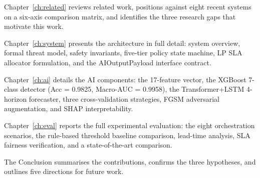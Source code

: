 Chapter~\ref{ch:related} reviews related work, positions \padonap{} against
eight recent systems on a six-axis comparison matrix, and identifies the
three research gaps that motivate this work.

Chapter~\ref{ch:system} presents the \padonap{} architecture in full detail:
system overview, formal threat model, safety invariants, five-tier policy
state machine, LP SLA allocator formulation, and the AIOutputPayload
interface contract.

Chapter~\ref{ch:ai} details the AI components: the 17-feature vector, the
XGBoost 7-class detector (Acc = 0.9825, Macro-AUC = 0.9958), the
Transformer+LSTM 4-horizon forecaster, three cross-validation strategies,
FGSM adversarial augmentation, and SHAP interpretability.

Chapter~\ref{ch:eval} reports the full experimental evaluation: the eight
orchestration scenarios, the rule-based threshold baseline comparison,
lead-time analysis, SLA fairness verification, and a state-of-the-art
comparison.

The Conclusion summarises the contributions, confirms the three hypotheses,
and outlines five directions for future work.
